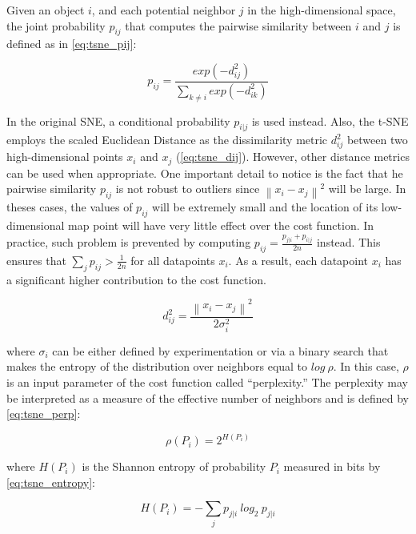 Given an object $i$, and each potential neighbor $j$ in the high-dimensional space, the joint probability $p_{ij}$ that computes the pairwise similarity between $i$ and $j$ is defined as in \autoref{eq:tsne_pij}:

\begin{equation}
\label{eq:tsne_pij}
p_{ij} = \frac{exp(-d_{ij}^2)}{\sum_{k \neq i}exp(-d_{ik}^2)}
\end{equation}

In the original SNE, a conditional probability $p_{i|j}$ is used instead. Also, the t-SNE employs the scaled Euclidean Distance as the dissimilarity metric $d_{ij}^2$ between two high-dimensional points $x_i$ and $x_j$ (\autoref{eq:tsne_dij}). However, other distance metrics can be used when appropriate. One important detail to notice is the fact that he pairwise similarity $p_{ij}$ is not robust to outliers since $\left\| x_i - x_j\right\|^2$ will be large. In theses cases, the values of $p_{ij}$ will be extremely small and the location of its low-dimensional map point will have very little effect over the cost function. In practice, such problem is prevented by computing $p_{ij} = \frac{p_{j|i} + p_{i|j}}{2n}$ instead. This ensures that $\sum_j p_{ij} > \frac{1}{2n}$ for all datapoints $x_i$. As a result, each datapoint $x_i$ has a significant higher contribution to the cost function.

\begin{equation}
\label{eq:tsne_dij}
d_{ij}^2 = \frac{\left\| x_i - x_j \right\|^2}{2\sigma_i^2}
\end{equation}

\noindent
where $\sigma_i$ can be either defined by experimentation or via a binary search that makes the entropy of the distribution over neighbors equal to $log\ \rho$. In this case, $\rho$ is an input parameter of the cost function called ``perplexity.'' The perplexity may be interpreted as a measure of the effective number of neighbors and is defined by \autoref{eq:tsne_perp}:

\begin{equation}
\label{eq:tsne_perp}
\rho(P_i) = 2^{H(P_i)}
\end{equation}

\noindent
where $H(P_i)$ is the Shannon entropy of probability $P_i$ measured in bits by \autoref{eq:tsne_entropy}:

\begin{equation}
\label{eq:tsne_entropy}
H(P_i) = -\sum_j p_{j|i}\ log_2\ p_{j|i}
\end{equation}

